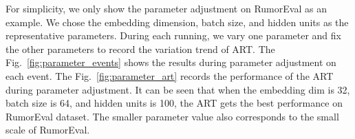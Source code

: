 For simplicity, we only show the parameter adjustment on RumorEval as an example. We chose the embedding dimension, batch size, and hidden units as the representative parameters. During each running, we vary one parameter and fix the other parameters to record the variation trend of ART. The Fig.~\ref{fig:parameter_events} shows the results during parameter adjustment on each event. The Fig.~\ref{fig:parameter_art} records the performance of the ART during parameter adjustment. It can be seen that when the embedding dim is 32, batch size is 64, and hidden units is 100, the ART gets the best performance on RumorEval dataset. The smaller parameter value also corresponds to the small scale of RumorEval.

\begin{figure}[htbp]
	\centering
	\setcounter{subfigure}{0}
\end{figure}
